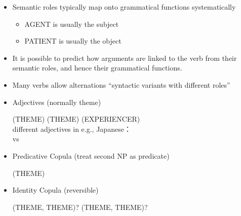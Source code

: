 \documentclass[a4paper,landscape,headrule,footrule,xetex]{foils}
\begin{document}
\begin{itemize}
\item    Semantic roles typically map onto grammatical 
  functions systematically
  \begin{itemize}
  \item  AGENT is usually the subject
  \item  PATIENT is usually the object
  \end{itemize}
\item  It is possible to predict how arguments are linked to 
the verb from their semantic roles, and hence their 
grammatical functions.

\item Many verbs allow alternations ``syntactic variants with different roles''

\begin{exe}
  \ex {}  
  \ex {}  
  \ex {}  
\end{exe}
\end{itemize}


\begin{itemize}
\item Adjectives  (normally theme)
  \begin{exe}
  \ex {} (THEME)
  \ex {} (THEME)
  \ex {} (EXPERIENCER)
    \\ different adjectives in e.g., Japanese：
    \\     vs  
  \end{exe}
\item Predicative Copula (treat second NP as predicate)
  \begin{exe}
  \ex {} (THEME)
  \end{exe}
\item Identity Copula (reversible)
  \begin{exe}
  \ex {} (THEME, THEME)?
  \ex {} (THEME, THEME)?
  \end{exe}


\end{itemize}
\end{document}
